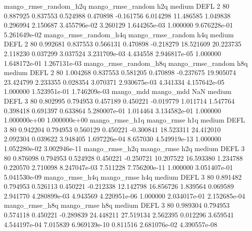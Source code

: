mango_rmse_random_h2q mango_rmse_random                  h2q     medium     DEFL                 2 80  0.887925       0.837553 0.524988       0.470898   -0.161756      6.014298     11.486585     1.049838       0.296994  2.150687 3.455796e-02     3.260129   1.644265e-03            1.000000    9.676228e-01        5.261649e-02
mango_rmse_random_h4q mango_rmse_random                  h4q     medium     DEFL                 2 80  0.992681       0.837553 0.566131       0.470898   -0.218279     18.521609     20.223735     2.118230       0.037299  3.037524 3.231709e-03     4.434558   2.946817e-05            1.000000    1.648172e-01        1.267131e-03
mango_rmse_random_h8q mango_rmse_random                  h8q     medium     DEFL                 2 80  1.004268       0.837553 0.581205       0.470898   -0.237675     19.905074     23.424799     2.233355       0.028354  3.070371 2.930675e-03     4.341334   4.157642e-05            1.000000    1.523951e-01        1.746209e-03
            mango_mdd         mango_mdd                  NaN     medium     DEFL                 3 80  0.802995       0.794953 0.457189       0.450221   -0.019779      1.011714      1.547764     0.398418       0.691397  0.633864 5.280007e-01     1.014464   3.134582e-01            1.000000    1.000000e+00        1.000000e+00
       mango_rmse_h1q        mango_rmse                  h1q     medium     DEFL                 3 80  0.942204       0.794953 0.560129       0.450221   -0.300841     18.523311     24.412010     2.092304       0.039622  3.948405 1.697226e-04     8.657030   4.549919e-13            1.000000    1.052280e-02        3.002946e-11
       mango_rmse_h2q        mango_rmse                  h2q     medium     DEFL                 3 80  0.876098       0.794953 0.524928       0.450221   -0.250721     10.207522     16.593380     1.234788       0.220570  2.710098 8.247047e-03     7.511228   7.756200e-11            1.000000    3.051407e-01        5.041530e-09
       mango_rmse_h4q        mango_rmse                  h4q     medium     DEFL                 3 80  0.891482       0.794953 0.526113       0.450221   -0.212338     12.142798     16.856726     1.839564       0.069589  2.941770 4.280899e-03     4.943569   4.220951e-06            1.000000    2.034017e-01        2.152685e-04
       mango_rmse_h8q        mango_rmse                  h8q     medium     DEFL                 3 80  0.989304       0.794953 0.574118       0.450221   -0.289839     24.448211     27.519134     2.562395       0.012296  3.659541 4.544197e-04     7.015839   6.969139e-10            0.811516    2.681076e-02        4.390557e-08
